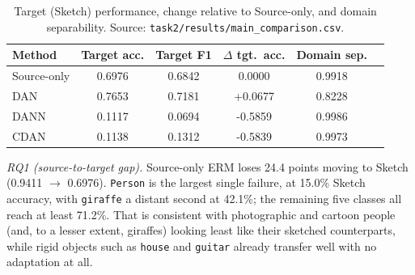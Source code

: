 \documentclass{article}
\begin{document}
\begin{table}[h]
  \centering
  \caption{Per-source-domain validation performance and mean-source performance. Source: \texttt{task2/results/main\_comparison.csv}.}
  \label{tab:task2-domains}
  \small
\end{table}

\begin{table}[h]
  \centering
  \caption{Target (Sketch) performance, change relative to Source-only, and domain separability. Source: \texttt{task2/results/main\_comparison.csv}.}
  \label{tab:task2-main}
  \small
  \begin{tabular}{lccccc}
    \toprule
    Method & Target acc. & Target F1 & $\Delta$ tgt.\ acc. & Domain sep. \\
    \midrule
    Source-only & 0.6976 & 0.6842 & 0.0000  & 0.9918 \\
    DAN         & 0.7653 & 0.7181 & +0.0677 & 0.8228 \\
    DANN        & 0.1117 & 0.0694 & -0.5859 & 0.9986 \\
    CDAN        & 0.1138 & 0.1312 & -0.5839 & 0.9973 \\
    \bottomrule
  \end{tabular}
\end{table}

\emph{RQ1 (source-to-target gap).} Source-only ERM loses 24.4 points moving to Sketch (0.9411
$\to$ 0.6976). \texttt{Person} is the largest single failure, at 15.0\% Sketch accuracy, with
\texttt{giraffe} a distant second at 42.1\%; the remaining five classes all reach at least 71.2\%.
That is consistent with photographic and cartoon people (and, to a lesser extent, giraffes) looking
least like their sketched counterparts, while rigid objects such as \texttt{house} and
\texttt{guitar} already transfer well with no adaptation at all.
\end{document}
